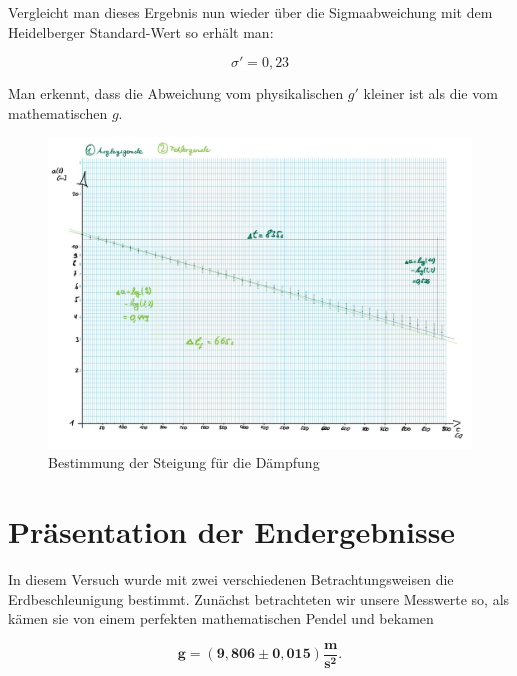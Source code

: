 \documentclass{article}
\begin{document}
Vergleicht man dieses Ergebnis nun wieder über die Sigmaabweichung mit dem Heidelberger Standard-Wert so erhält man:

\begin{equation}
    \sigma' = 0,23
\end{equation}

Man erkennt, dass die Abweichung vom physikalischen $g'$ kleiner ist als die vom mathematischen $g$.

\bigskip

\bigskip

\bigskip

\begin{figure} [!h]
    \centering
    \includegraphics[width=\textwidth]{graphics/dia1.jpg}
    \caption{Bestimmung der Steigung für die Dämpfung}
    \label{fig:dämpfung}
\end{figure}

\newpage
\section{Präsentation der Endergebnisse}

In diesem Versuch wurde mit zwei verschiedenen Betrachtungsweisen die Erdbeschleunigung bestimmt. Zunächst betrachteten wir unsere Messwerte so, als kämen sie von einem perfekten mathematischen Pendel und bekamen  

\begin{equation}
    \bm{g} = \bm{(9,806 \pm 0,015) \frac{\textbf{m}}{\textbf{s}^2}}.
\end{equation}
\end{document}
